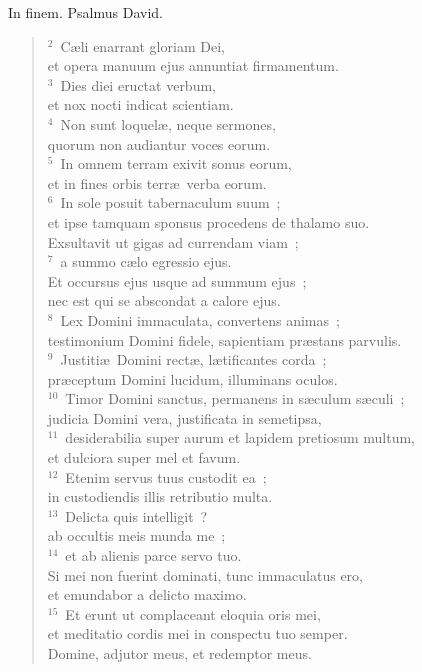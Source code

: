 \lettrine[lines=3,image=true,loversize=0.05,lraise=-0.03]{I}{}n finem. Psalmus David.
\begin{flushleft}\begin{verse}\vspace{6pt}${}^{2}$~C\ae li enarrant gloriam Dei,\\ et opera manuum ejus annuntiat firmamentum.\\
${}^{3}$~Dies diei eructat verbum,\\ et nox nocti indicat scientiam.\\
${}^{4}$~Non sunt loquel\ae , neque sermones,\\ quorum non audiantur voces eorum.\\
${}^{5}$~In omnem terram exivit sonus eorum,\\ et in fines orbis terr\ae\ verba eorum.\\
${}^{6}$~In sole posuit tabernaculum suum~;\\ et ipse tamquam sponsus procedens de thalamo suo.\\ Exsultavit ut gigas ad currendam viam~;\\
${}^{7}$~a summo c\ae lo egressio ejus.\\ Et occursus ejus usque ad summum ejus~;\\ nec est qui se abscondat a calore ejus.\\
${}^{8}$~Lex Domini immaculata, convertens animas~;\\ testimonium Domini fidele, sapientiam pr\ae stans parvulis.\\
${}^{9}$~Justiti\ae\ Domini rect\ae , l\ae tificantes corda~;\\ pr\ae ceptum Domini lucidum, illuminans oculos.\\
${}^{10}$~Timor Domini sanctus, permanens in s\ae culum s\ae culi~;\\ judicia Domini vera, justificata in semetipsa,\\
${}^{11}$~desiderabilia super aurum et lapidem pretiosum multum,\\ et dulciora super mel et favum.\\
${}^{12}$~Etenim servus tuus custodit ea~;\\ in custodiendis illis retributio multa.\\
${}^{13}$~Delicta quis intelligit~?\\ ab occultis meis munda me~;\\
${}^{14}$~et ab alienis parce servo tuo.\\ Si mei non fuerint dominati, tunc immaculatus ero,\\ et emundabor a delicto maximo.\\
${}^{15}$~Et erunt ut complaceant eloquia oris mei,\\ et meditatio cordis mei in conspectu tuo semper.\\ Domine, adjutor meus, et redemptor meus.\end{verse}\end{flushleft}



